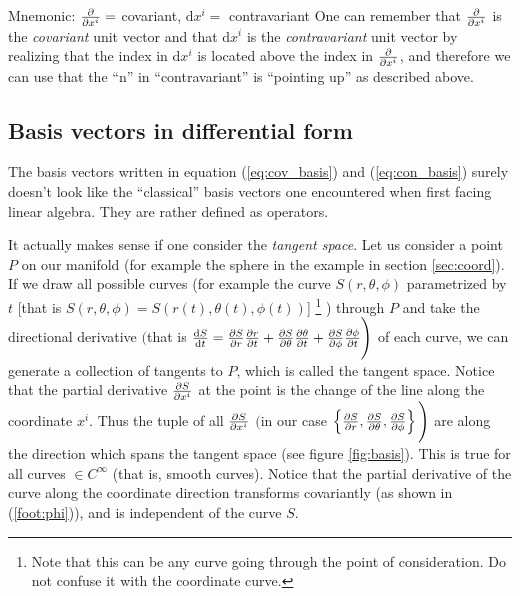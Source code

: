 \documentclass[a4paper, 12pt]{article}
\begin{document}
\vspace{0.5cm}
\begin{greenbox}{Mnemonic: $\frac{\partial {}}{\partial{x^i}} = $ covariant,  $\text{d}x^i = $ 
contravariant }
 One can remember that $\frac{\partial {}}{\partial{x^i}}$ is the \emph{covariant} unit vector 
and that $\text{d}x^i$ is the \emph{contravariant} unit vector by realizing 
that the index in $\text{d}x^i$ is located above the index in $\frac{\partial {}}{\partial{x^i}}$, 
and therefore we can use that the ``n'' in ``contravariant'' is ``pointing up'' 
as described above.
\end{greenbox}


\subsection{Basis vectors in differential form}\label{sec:bvdf}
The basis vectors written in equation (\ref{eq:cov_basis}) and 
(\ref{eq:con_basis}) surely doesn't look like the ``classical'' basis vectors 
one encountered when first facing linear algebra. They are rather defined as 
operators. 

It actually makes sense if one consider the \emph{tangent space}. Let us 
consider a point $P$ on our manifold (for example the sphere in the example in 
section \ref{sec:coord}). If we draw all possible curves (for example 
the curve $S(r,\theta,\phi)$ parametrized by $t$ [that is 
$S(r,\theta,\phi) = S(r(t),\theta(t),\phi(t))$]%
%
\footnote{\label{note:curve}Note that this can be any curve going through the 
          point of consideration. Do not confuse it with the coordinate curve.}%
%
) through $P$ and take the directional derivative $\Bigg($that is $\frac{\text{d}{S}}{\text{d}{t}} = 
\frac{\partial {S}}{\partial{r}}\frac{\partial {r}}{\partial{t}} + \frac{\partial {S}}{\partial{\theta}}\frac{\partial {\theta}}{\partial{t}} + 
\frac{\partial {S}}{\partial{\phi}}\frac{\partial {\phi}}{\partial{t}}\Bigg)$ of each curve, we can generate a 
collection of tangents to $P$, which is called the tangent space. Notice that 
the partial derivative $\frac{\partial {S}}{\partial{x^i}}$ at the point is the change of the line 
along the coordinate $x^i$. Thus the tuple of all $\frac{\partial {S}}{\partial{x^i}}$ $\Bigg($in 
our case $\left\{\frac{\partial {S}}{\partial{r}}, \frac{\partial {S}}{\partial{\theta}}, \frac{\partial {S}}{\partial{\phi}}\right\} \Bigg)$ are 
along the direction which spans the tangent space (see figure \ref{fig:basis}). 
This is true for all curves $\in C^{\infty}$ (that is, smooth curves). Notice 
that the partial derivative of the curve along the coordinate direction 
transforms covariantly (as shown in (\ref{foot:phi})), and is independent of the 
curve $S$.
\end{document}
